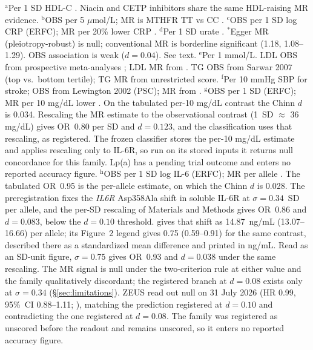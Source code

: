 \documentclass[11pt]{article}
\begin{document}
\begin{table}[t]
\vspace{1mm}
{\footnotesize
$^\text{a}$Per 1 SD HDL-C \cite{voight2012}. Niacin and CETP inhibitors share the same HDL-raising MR evidence.
$^\text{b}$OBS per 5 $\mu$mol/L; MR is MTHFR TT vs CC \cite{clarke2012}.
$^\text{c}$OBS per 1 SD log CRP (ERFC); MR per 20\% lower CRP \cite{elliott2009}.
$^\text{d}$Per 1 SD urate \cite{white2016}. $^*$Egger MR (pleiotropy-robust) is null; conventional MR is borderline significant (1.18, 1.08--1.29). OBS association is weak ($d = 0.04$). See text.
$^\text{e}$Per 1 mmol/L. LDL OBS from prospective meta-analyses \cite{ference2019ldl}; LDL MR from \citet{holmes2015}. TG OBS from Sarwar 2007 (top vs.\ bottom tertile); TG MR from \citet{holmes2015} unrestricted score.
$^\text{f}$Per 10 mmHg SBP for stroke; OBS from Lewington 2002 (PSC); MR from \citet{georgakis2020}.
$^\text{g}$OBS per 1 SD (ERFC); MR per 10 mg/dL lower \cite{burgess2018lpa}. On the tabulated per-10 mg/dL contrast the Chinn $d$ is 0.034. Rescaling the MR estimate to the observational contrast (1~SD $\approx$ 36 mg/dL) gives OR~0.80 per SD and $d = 0.123$, and the classification uses that rescaling, as registered. The frozen classifier stores the per-10 mg/dL estimate and applies rescaling only to IL-6R, so run on its stored inputs it returns null concordance for this family. Lp(a) has a pending trial outcome and enters no reported accuracy figure.
$^\text{h}$OBS per 1 SD log IL-6 (ERFC); MR per allele \cite{interleukin2012}. The tabulated OR~0.95 is the per-allele estimate, on which the Chinn $d$ is 0.028. The preregistration fixes the \emph{IL6R} Asp358Ala shift in soluble IL-6R at $\sigma = 0.34$~SD per allele, and the per-SD rescaling of Materials and Methods gives OR~0.86 and $d = 0.083$, below the $d = 0.10$ threshold. \citet{interleukin2012} gives that shift as 14.87~ng/mL (13.07--16.66) per allele; its Figure~2 legend gives 0.75 (0.59--0.91) for the same contrast, described there as a standardized mean difference and printed in ng/mL. Read as an SD-unit figure, $\sigma = 0.75$ gives OR~0.93 and $d = 0.038$ under the same rescaling. The MR signal is null under the two-criterion rule at either value and the family qualitatively discordant; the registered branch at $d = 0.08$ exists only at $\sigma = 0.34$ (\S\ref{sec:limitations}). ZEUS read out null on 31 July 2026 (HR 0.99, 95\%~CI 0.88--1.11; \cite{novonordisk2026zeus}), matching the prediction registered at $d = 0.10$ and contradicting the one registered at $d = 0.08$. The family was registered as unscored before the readout and remains unscored, so it enters no reported accuracy figure.
}
\end{table}
\end{document}
